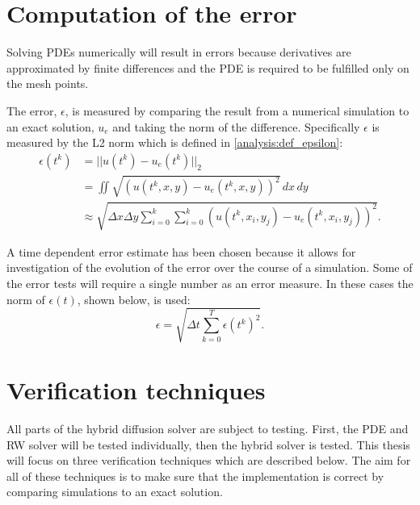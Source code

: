 \section{Computation of the error}

Solving PDEs numerically will result in errors because derivatives are approximated by finite differences and the PDE is required to be fulfilled only on the mesh points. 
% 
% 

The error, $\epsilon$, is measured by comparing the result from a numerical simulation to an exact solution, $u_e$ and taking the norm of the difference. 
Specifically $\epsilon$ is measured by the L2 norm which is defined in \eqref{analysis:def_epsilon}:
\begin{align}
 \epsilon(t^k) &= ||u(t^k)-u_e(t^k)||_2 \nonumber \\
 &= \iint\sqrt{\left(u(t^k,x,y)-u_e(t^k,x,y)\right)^2}\,dx\,dy \label{analysis:def_epsilon} \\
 &\approx \sqrt{\Delta x\Delta y\sum\limits_{i=0}^k\sum\limits_{i=0}^k \left(u(t^k,x_i,y_j)-u_e(t^k,x_i,y_j)\right)^2}.\nonumber
 \end{align}
 
\noindent A time dependent error estimate has been chosen because it allows for investigation of the evolution of the error over the course of a simulation.
Some of the error tests will require a single number as an error measure. 
In these cases the norm of $\epsilon(t)$, shown below, is used:
\begin{equation}\label{analysis:convergence_test_error}
 \epsilon = \sqrt{\Delta t\sum\limits_{k=0}^T\epsilon(t^k)^2}.
\end{equation}

\section{Verification techniques}
All parts of the hybrid diffusion solver are subject to testing. First, the PDE and RW solver will be tested individually, then the hybrid solver is tested. 
This thesis will focus on three verification techniques which are described below. 
The aim for all of these techniques is to make sure that the implementation is correct by comparing simulations to an exact solution. \\


